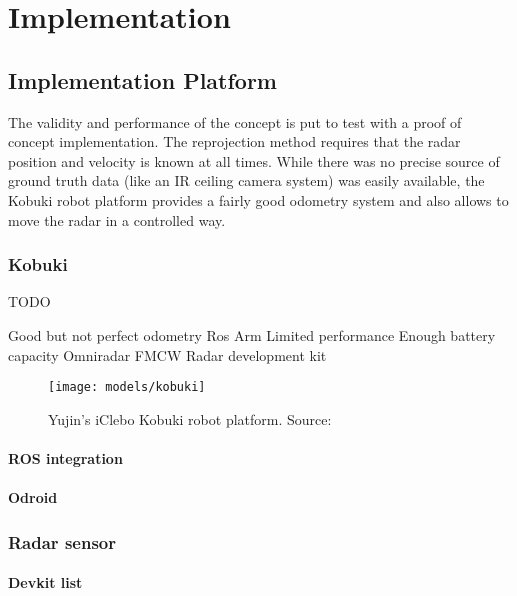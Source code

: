 
\chapter{Implementation}\label{implementation}

\section{Implementation Platform}\label{implementation-platform}

The validity and performance of the concept is put to test with a proof
of concept implementation. The reprojection method requires that the
radar position and velocity is known at all times. While there was no
precise source of ground truth data (like an IR ceiling camera system)
was easily available, the Kobuki robot platform provides a fairly good
odometry system and also allows to move the radar in a controlled way.

\subsection{Kobuki}\label{kobuki}

TODO

Good but not perfect odometry Ros Arm Limited performance Enough battery
capacity Omniradar FMCW Radar development kit

\begin{figure}[htbp]
    \centering
    \label{fig:kobuki}
    \texttt{[image: models/kobuki]}
    \caption{Yujin's iClebo Kobuki robot platform. Source: \cite{DesignK2013}}
\end{figure}

\subsubsection{ROS integration}\label{ros-integration}

\subsubsection{Odroid}\label{odroid}

\subsection{Radar sensor}\label{radar-sensor}

\subsubsection{Devkit list}\label{devkit-list}

